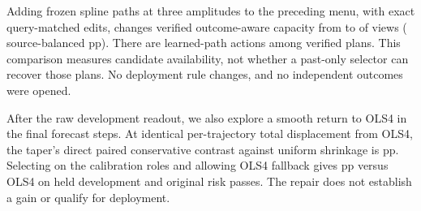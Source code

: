 Adding frozen spline paths at three amplitudes to the preceding menu,
with \VelSplineCapacityEdits{} exact query-matched edits, changes verified
outcome-aware capacity from \VelSplineOldCapacity{} to
\VelSplineNewCapacity{} of \VelSplineViews{} views
(\VelSplineCapacityDelta{} source-balanced pp). There are
\VelSplineLearnedEdits{} learned-path actions among verified plans.
This comparison measures candidate availability, not whether a
past-only selector can recover those plans. No deployment rule changes,
and no independent outcomes were opened.

After the raw development readout, we also explore a smooth return to
OLS4 in the final forecast steps. At identical per-trajectory total
displacement from OLS4, the taper's direct paired conservative contrast
against uniform shrinkage is \VelSplineTailMatched{} pp. Selecting on
the calibration roles and allowing OLS4 fallback gives
\VelSplineTailSelected{} pp versus OLS4 on held development and
\VelSplineTailPasses{} original risk passes. The repair does not
establish a gain or qualify for deployment.
